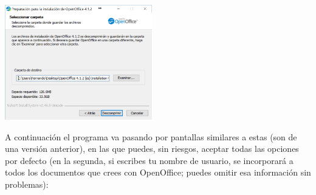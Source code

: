 \documentclass[10pt,a4paper]{article}\usepackage[]{graphicx}\usepackage[]{color}
\newcounter {cont01}
\begin{document}
    \begin{center}
    \includegraphics[height=5cm]{../fig/Tut00-OpenOffice-05-201605.png}
    \end{center}
A continuación el programa va pasando por pantallas similares a estas (son de una versión anterior), en las que puedes, 
sin riesgos, aceptar todas las opciones por defecto (en la segunda, si escribes tu nombre de usuario, se
incorporará a todos los documentos que crees con OpenOffice; puedes omitir esa información sin
problemas):
\end{document}
